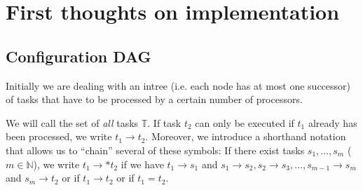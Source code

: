 \documentclass[letter]{report}
\newcommand{\alltasks}{{\mathbb T}}
\newcommand{\neededfor}{\rightarrow}
\begin{document}
\newcommand{\leveltop}{0}
\newcommand{\leveltopI}{0}
\newcommand{\leveltopII}{0}
\newcommand{\leveltopIII}{0}
\newcommand{\leveltopIIII}{0}
\newcommand{\leveltopIIIII}{0}
\newcommand{\leveltopIIIIII}{0}
\newcommand{\leveltopIIIIIII}{0}
\newcommand{\leveltopIIIIIIII}{0}
\newcommand{\leveltopIIIIIIIII}{0}
\newcommand{\leveltopIIIIIIIIII}{0}
\newcommand{\leveltopIIIIIIIIIII}{0}
\newcommand{\leveltopIIIIIIIIIIII}{0}
\newcommand{\leveltopIIIIIIIIIIIII}{0}
\newcommand{\leveltopIIIIIIIIIIIIII}{0}
\newcommand{\leveltopIIIIIIIIIIIIIII}{0}
\newcommand{\leveltopIIIIIIIIIIIIIIII}{0}
\newcommand{\leveltopIIIIIIIIIIIIIIIII}{0}
\newcommand{\leveltopIIIIIIIIIIIIIIIIII}{0}
\newcommand{\leveltopIIIIIIIIIIIIIIIIIII}{0}
\newcommand{\leveltopIIIIIIIIIIIIIIIIIIII}{0}
\newcommand{\leveltopIIIIIIIIIIIIIIIIIIIII}{0}
\newcommand{\leveltopIIIIIIIIIIIIIIIIIIIIII}{0}
\newcommand{\leveltopIIIIIIIIIIIIIIIIIIIIIII}{0}
\newcommand{\leveltopIIIIIIIIIIIIIIIIIIIIIIII}{0}
\newcommand{\leveltopIIIIIIIIIIIIIIIIIIIIIIIII}{0}
\newcommand{\leveltopIIIIIIIIIIIIIIIIIIIIIIIIII}{0}
\newcommand{\leveltopIIIIIIIIIIIIIIIIIIIIIIIIIII}{0}
\newcommand{\leveltopIIIIIIIIIIIIIIIIIIIIIIIIIIII}{0}
\newcommand{\leveltopIIIIIIIIIIIIIIIIIIIIIIIIIIIII}{0}



\chapter{First thoughts on implementation}
\label{chap:first-thoughts-on-implementation}

\section{Configuration DAG}
\label{sec:configuration-dag}

Initially we are dealing with an intree (i.e. each node has at most one successor) of tasks that have to be processed by a certain number of processors.

We will call the set of \emph{all} tasks $\alltasks$. If task $t_2$ can only be executed if $t_1$ already has been processed, we write $t_1 \neededfor t_2$. Moreover, we introduce a shorthand notation that allows us to ``chain'' several of these symbols: If there exist tasks $s_1,\dots,s_m$ ($m\in\mathbb N$), we write $t_1 \neededfor* t_2$ if we have $t_1 \neededfor s_1$ and $s_1 \neededfor s_2, s_2 \neededfor s_3, \dots, s_{m-1} \neededfor s_m$ and $s_m \neededfor t_2$ or if $t_1\neededfor t_2$ or if $t_1=t_2$.
\end{document}
